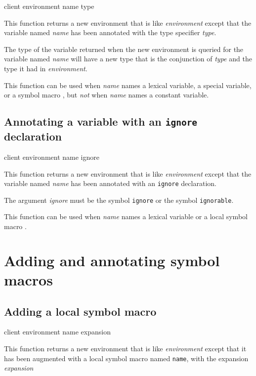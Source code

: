 {\footnotesize
{} {client environment name type}
}

This function returns a new environment that is like
\textit{environment} except that the variable named \textit{name} has
been annotated with the type specifier \textit{type}.

The type of the variable returned when the new environment is queried
for the variable named \textit{name} will have a new type that is the
conjunction of \textit{type} and the type it had in
\textit{environment}.

This function can be used when \textit{name} names a lexical variable,
a special variable, or a symbol macro
, but \emph{not}
when \textit{name} names a constant variable.

\subsection{Annotating a variable with an \texttt{ignore} declaration}
\label{sec-annotating-a-variable-with-ignore}

{\footnotesize
{} {client environment name ignore}
}

This function returns a new environment that is like
\textit{environment} except that the variable named \textit{name} has
been annotated with an \texttt{ignore} declaration.

The argument \textit{ignore} must be the symbol \texttt{ignore} or the
symbol \texttt{ignorable}.

This function can be used when \textit{name} names a lexical variable
or a local symbol macro
.

\section{Adding and annotating symbol macros}

\subsection{Adding a local symbol macro}

{\footnotesize
{} {client environment name expansion}
}

This function returns a new environment that is like
\textit{environment} except that it has been augmented with a local
symbol macro named \texttt{name}, with the expansion
\textit{expansion}

